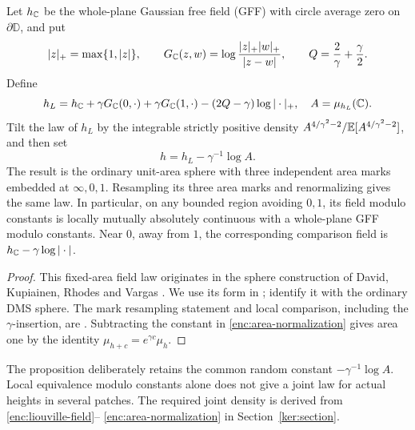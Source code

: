 \begin{proposition}
\label{enc:sphere-representation}
Let $h_{\mathbb C}$ be the whole-plane Gaussian free field (GFF) with circle average zero on
$\partial\mathbb D$, and put
\[
 |z|_+=\max\{1,|z|\},\qquad
 G_{\mathbb C}(z,w)=\log\frac{|z|_+|w|_+}{|z-w|},\qquad
 Q=\frac2\gamma+\frac\gamma2.
\]
Define
\begin{equation}\label{enc:liouville-field}
 h_L=h_{\C}+\gamma G_{\C}(0,\cdot)+\gamma G_{\C}(1,\cdot)
       -(2Q-\gamma)\log|\cdot|_+,
 \quad A=\mu_{h_L}(\C).
\end{equation}
Tilt the law of $h_L$ by the integrable strictly positive density
$A^{4/\gamma^2-2}/\mathbb E[A^{4/\gamma^2-2}]$, and then set
\begin{equation}\label{enc:area-normalization}
 h=h_L-\gamma^{-1}\log A.
\end{equation}
The result is the ordinary unit-area sphere with three independent
area marks embedded at $\infty,0,1$.  Resampling its three area marks and
renormalizing gives the same law.  In particular, on any bounded region
avoiding $0,1$, its field modulo constants is locally mutually absolutely
continuous with a whole-plane GFF modulo constants.  Near $0$, away from
$1$, the corresponding comparison field is $h_{\mathbb C}-\gamma\log|\cdot|$.
\end{proposition}

\begin{proof}
This fixed-area field law originates in the sphere construction of
David, Kupiainen, Rhodes and Vargas
\citep[Section~3.3, Proposition~3.8 and Section~3.4]{DKRVSphere2016}.
We use its form in \citet[Definition~2.2]{BorgaGwynneSunPermutons};
\citet[Theorem~1.1 and Remark~1.2]{AruHuangSunSphere} identify it with
the ordinary DMS sphere.
The mark resampling statement and local comparison, including the
$\gamma$-insertion, are \cite[Lemmas 2.3--2.4]{BorgaGwynneSunPermutons}.
Subtracting the constant in \eqref{enc:area-normalization} gives area one
by the identity $\mu_{h+c}=e^{\gamma c}\mu_h$.
\end{proof}

The proposition deliberately retains the common random constant
$-\gamma^{-1}\log A$.  Local equivalence modulo constants alone does not
give a joint law for actual heights in several patches.  The required
joint density is derived from \eqref{enc:liouville-field}--
\eqref{enc:area-normalization} in Section~\ref{ker:section}.

